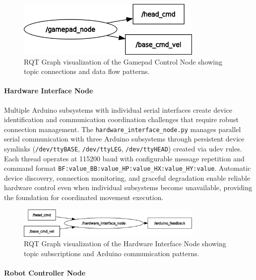 \begin{figure}[H]
    \centering
    \includegraphics[width=0.8\textwidth]{Images/gamepadnode.png}
    \caption{RQT Graph visualization of the Gamepad Control Node showing topic connections and data flow patterns.}
    \label{fig:rqt_gamepad_node}
\end{figure}

\paragraph{Hardware Interface Node}

Multiple Arduino subsystems with individual serial interfaces create device identification and communication coordination challenges that require robust connection management. The \texttt{hardware\_interface\_node.py} manages parallel serial communication with three Arduino subsystems through persistent device symlinks (\texttt{/dev/ttyBASE}, \texttt{/dev/ttyLEG}, \texttt{/dev/ttyHEAD}) created via udev rules. Each thread operates at 115200 baud with configurable message repetition and command format \texttt{BF:value\_BB:value\_HP:value\_HX:value\_HY:value}. Automatic device discovery, connection monitoring, and graceful degradation enable reliable hardware control even when individual subsystems become unavailable, providing the foundation for coordinated movement execution.

\begin{figure}[H]
    \centering
    \includegraphics[width=0.8\textwidth]{Images/hardwarenode.png}
    \caption{RQT Graph visualization of the Hardware Interface Node showing topic subscriptions and Arduino communication patterns.}
    \label{fig:rqt_hardware_interface_node}
\end{figure}

\paragraph{Robot Controller Node}

